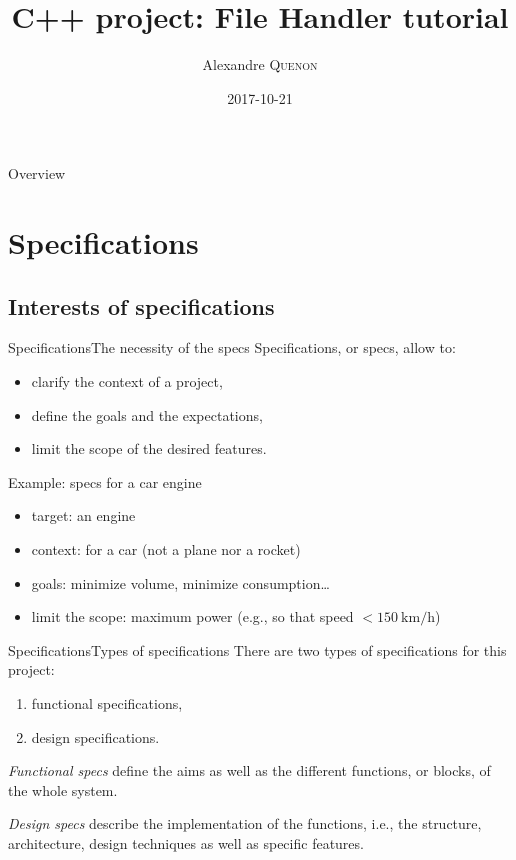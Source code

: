\documentclass[11pt,handout]{beamer}
\author{Alexandre \textsc{Quenon}}
\date{2017-10-21}%
\title[C++ File Handler tutorial]{C++ project: File Handler tutorial}
\begin{document}
\begin{frame}
	\titlepage
\end{frame}

\begin{frame}{Overview}
	\tableofcontents
\end{frame}


\section{Specifications}

	\subsection{Interests of specifications}
	
		\begin{frame}{Specifications}{The necessity of the specs}
			Specifications, or specs, allow to:
			\begin{itemize}
				\item clarify the context of a project,
				\item define the goals and the expectations,
				\item limit the scope of the desired features.
			\end{itemize}
		
			\begin{exampleblock}{Example: specs for a car engine}
				\begin{itemize}
					\item target: an engine
					\item context: for a car (not a plane nor a rocket)
					\item goals: minimize volume, minimize consumption\dots
					\item limit the scope: maximum power (e.g., so that speed $< \SI{150}{\km\per\hour}$)
				\end{itemize}
				
			\end{exampleblock}
		\end{frame}
		
		\begin{frame}{Specifications}{Types of specifications}
			There are two types of specifications for this project:
			\begin{enumerate}
				\item functional specifications,
				\item design specifications.
			\end{enumerate}
		
			\emph{Functional specs} define the aims as well as the different functions, or blocks, of the whole system.
			
			\emph{Design specs} describe the implementation of the functions, i.e., the structure, architecture, design techniques as well as specific features.
		\end{frame}
	
\end{document}
